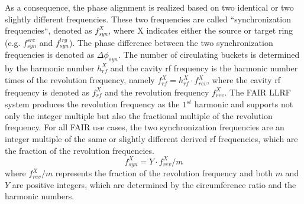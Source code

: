 As a consequence, the phase alignment is realized based on two identical or two slightly different frequencies. These two frequencies are called ``synchronization frequencies``, denoted as $f_\mathit{syn}^{X}$, where X indicates either the source or target ring (e.g. $f_\mathit{syn}^{src}$ and $f_\mathit{syn}^{trg}$). The phase difference between the two synchronization frequencies is denoted as $\Delta \phi_\mathit{syn}$. The number of circulating buckets is determined by the harmonic number $h_\mathit{rf}^{X}$ and the cavity rf frequency is the harmonic number times of the revolution frequency, namely $f_\mathit{rf}^{X} = h_\mathit{rf}^{X}\cdot f_\mathit{rev}^{X}$, where the cavity rf frequency is denoted as $f_\mathit{rf}^{X}$ and the revolution frequency $f_\mathit{rev}^{X}$. The FAIR LLRF system produces the revolution frequency as the $1^{st}$ harmonic and supports not only the integer multiple but also the fractional multiple of the revolution frequency. For all FAIR use cases, the two synchronization frequencies are an integer multiple of the same or slightly different derived rf frequencies, which are the fraction of the revolution frequencies.
\begin{equation}
f_\mathit{syn}^{X}= Y\cdot f_\mathit{rev}^{X}/m
\label{syn_form}
\end{equation}
where $f_\mathit{rev}^{X}/m$ represents the fraction of the revolution frequency and both $m$ and $Y$ are positive integers, which are determined by the circumference ratio and the harmonic numbers. 
